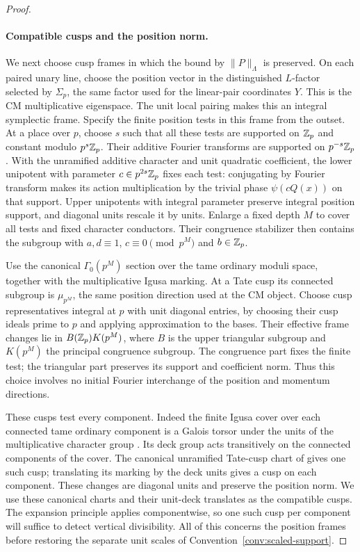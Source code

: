 \begin{proof}
 \paragraph{Compatible cusps and the position norm.}
 We next choose cusp frames in which the bound by $\|P\|_\Lambda$
 is preserved.  On each paired unary line, choose the position vector
 in the distinguished $L$-factor selected by $\Sigma_p$, the same
 factor used for the linear-pair coordinates $Y$.  This is the CM
 multiplicative eigenspace.  The unit local pairing makes this an
 integral symplectic frame.  Specify the finite position tests in
 this frame from the outset.  At a place over $p$, choose
 $s$ such that all these tests are supported on $\mathbb Z_p$ and constant
 modulo $p^s\mathbb Z_p$.  Their additive Fourier transforms are supported
 on $p^{-s}\mathbb Z_p$.  With the unramified additive character and unit
 quadratic coefficient, the lower unipotent with parameter
 $c\in p^{2s}\mathbb Z_p$ fixes each test: conjugating by Fourier transform
 makes its action multiplication by the trivial phase
 $\psi(cQ(x))$ on that support.  Upper unipotents with integral
 parameter preserve integral position support, and diagonal units
 rescale it by units.  Enlarge a fixed depth $M$ to cover all tests
 and fixed character conductors.  Their congruence stabilizer then
 contains the subgroup with $a,d\equiv1$, $c\equiv0\pmod {p^M}$
 and $b\in\mathbb Z_p$.

 Use the canonical $\Gamma_0(p^M)$ section over the tame ordinary
 moduli space, together with the multiplicative Igusa marking.
 At a Tate cusp its connected subgroup is $\mu_{p^M}$, the same
 position direction used at the CM object.  Choose cusp
 representatives integral at $p$ with unit diagonal entries, by
 choosing their cusp ideals prime to $p$ and applying approximation
 to the bases.
 Their effective frame changes lie in $B(\mathbb Z_p)K(p^M)$, where $B$
 is the upper triangular subgroup and $K(p^M)$ the principal
 congruence subgroup.  The congruence part fixes the finite test;
 the triangular part preserves its support and coefficient norm.
 Thus this choice involves no initial Fourier interchange of the
 position and momentum directions.

 These cusps test every component.  Indeed the finite Igusa cover
 over each connected tame ordinary component is a Galois torsor
 under the units of the multiplicative character group
 \citep[Sections~7.2 and~11.1]{AndreattaGoren2005}.  Its deck group acts
 transitively on the connected components of the cover.  The
 canonical unramified Tate-cusp chart of
 \citet[Sections~6.5 and~11.7]{AndreattaGoren2005} gives one such
 cusp; translating its marking by the deck units gives a cusp on
 each component.  These changes are diagonal units and preserve the
 position norm.  We use these canonical charts and their unit-deck
 translates as the compatible cusps.  The expansion principle applies componentwise, so
 one such cusp per component will suffice to detect vertical
 divisibility.  All of this concerns the position frames before restoring
 the separate unit scales of Convention~\ref{conv:scaled-support}.


\end{proof}

